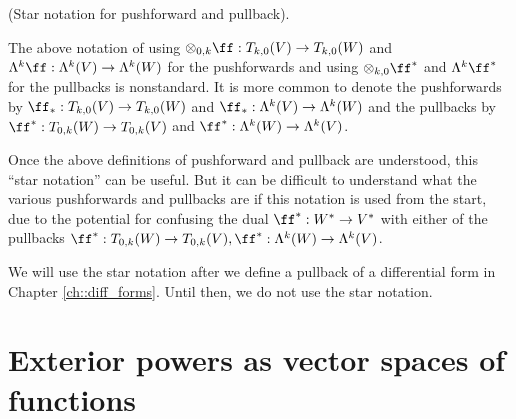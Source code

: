 \begin{remark}
\label{ch::exterior_powers::rmk::star_notation_pushforward_pullback}
    (Star notation for pushforward and pullback).
    
    The above notation of using $\otimes_{0, k} \ff:T_{k,0}(V) \rightarrow T_{k,0}(W)$ and $\Lambda^k \ff:\Lambda^k(V) \rightarrow \Lambda^k(W)$ for the pushforwards and using $\otimes_{k, 0} \ff^*$ and $\Lambda^k \ff^*$ for the pullbacks is nonstandard. It is more common to denote the pushforwards by ${\ff_*:T_{k,0}(V) \rightarrow T_{k,0}(W)}$ and ${\ff_*:\Lambda^k(V) \rightarrow \Lambda^k(W)}$ and the pullbacks by ${\ff^*:T_{0,k}(W) \rightarrow T_{0,k}(V)}$ and ${\ff^*:\Lambda^k(W) \rightarrow \Lambda^k(V)}$.
    
    Once the above definitions of pushforward and pullback are understood, this ``star notation'' can be useful. But it can be difficult to understand what the various pushforwards and pullbacks are if this notation is used from the start, due to the potential for confusing the dual $\ff^*:W^* \rightarrow V^*$ with either of the pullbacks ${\ff^*:T_{0,k}(W) \rightarrow T_{0,k}(V)}, {\ff^*:\Lambda^k(W) \rightarrow \Lambda^k(V)}$.
    
    We will use the star notation after we define a pullback of a differential form in Chapter \ref{ch::diff_forms}. Until then, we do not use the star notation.
\end{remark}

\section{Exterior powers as vector spaces of functions}

    

